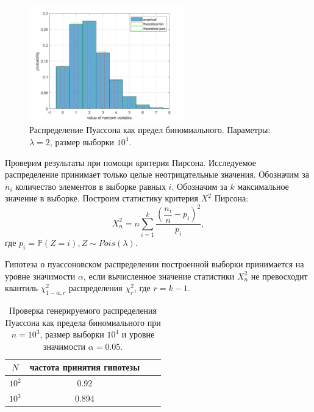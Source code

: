\documentclass[oneside, final, 12pt]{article}
\def\P{{\mathbb{P} }}
\begin{document}
	\begin{figure}[h!]
		\centering
		\includegraphics[width=0.6\textwidth]{../code/Task_3/pict/pois_bin_vis_ex.png}
		\caption{Распределение Пуассона как предел биномиального. 
		\newline \centering Параметры: $\lambda = 2$, размер выборки $10^4$.}
    \end{figure}

	Проверим результаты при помощи критерия Пирсона. \newline
	Исследуемое распределение принимает только целые неотрицательные значения.
	Обозначим за $n_i$ количество элементов в выборке равных $i$. Обозначим за $k$ 
	максимальное значение в выборке. Построим статистику критерия $X^2$ Пирсона:
	$$
		X^2_n =n \sum\limits_{i=1}^{k}\dfrac{\left(\dfrac{n_i}{n} - p_i\right)^2}{p_i},
	$$ 
	где $p_i=\P(Z=i), Z\sim Pois(\lambda)$.
	
	Гипотеза о пуассоновском распределении построенной выборки принимается на уровне значимости 
	$\alpha$, если вычисленное значение статистики $X_n^2$ не превосходит квантиль $\chi^2_{1-\alpha, r}$
	распределения $\chi_r^2$, где $r= k-1$.

	\begin{table}[h!]
	\begin{center}
		\begin{tabular}{|c|c|c|c|}
			\hline $N$ & частота принятия гипотезы \\ \hline
				$10^2$ & 0.92  \\ \hline
				$10^3$ & 0.894 \\ \hline
		\end{tabular}
		\caption{Проверка генерируемого распределения Пуассона как предела биномиального
						\newline \centering при $n=10^3$, размер выборки $10^4$ и уровне значимости $\alpha=0.05.$}
	\end{center}
	\end{table}
\end{document}

